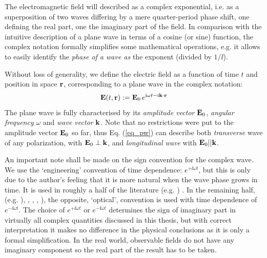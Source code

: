 The electromagnetic field will described as a complex exponential, i.e. as a superposition of two waves differing by a mere quarter-period phase shift, one defining the real part, one the imaginary part of the field. In comparison with the intuitive description of a plane wave in terms of a cosine (or sine) function, the complex notation formally simplifies some mathematical operations, e.g. it allows to easily identify the \textit{phase of a wave as} the exponent (divided by $1/\ii$). 

 

Without loss of generality, we define the electric field as a function of time $t$ and position in space ${\mathbf{r}}$, corresponding to a plane wave in the complex notation:
\begin{equation} \mathbf{E}(t, {\mathbf{r}}) := \mathbf{E}_0\, e^{{\mathrm i}\omega t - {\mathrm i}{\mathbf{k}}\cdot{\mathbf{r}}} \label{eq_pw}\end{equation}
The plane wave is fully characterised by its \textit{amplitude vector} $\mathbf{E}_0$, \textit{angular frequency} $\omega$ and \textit{wave vector} ${\mathbf{k}}$. Note that no restrictions were put to the amplitude vector $\mathbf{E}_0$ so far, thus Eq. (\ref{eq_pw}) can describe both \textit{transverse} wave of any polarization, with $\mathbf{E}_0 \perp {\mathbf{k}}$, and \textit{longitudinal wave} with $\mathbf{E}_0 || {\mathbf{k}}$.

An important note shall be made on the sign convention for the complex wave. 
We use the `engineering' convention of time dependence: $e^{+\ii \omega t}$, but this is only due to the author's feeling that it is more natural when the wave phase grows in time. 
It is used in  roughly a half of the literature 
(e.g. \cite[p. 9]{engheta2006book}
\cite[pp. 21, 99]{krowne2007book}
\cite[chap. 1-4, 6, 9, 10]{eleftheriades2005book})
.  In the remaining half,
(e.g. \cite[chap. 5, 7, 8]{eleftheriades2005book}),
\cite{jackson1962book}, 
\cite{veselago1968},
\cite{born1999book}, \cite[p. 5]{noginov2011book}), 
the opposite, `optical', convention is used with time dependence of $e^{-\ii \omega t}$. 
The choice of $e^{+\ii\omega t}$ or $e^{-\ii\omega t}$ determines the sign of imaginary part in virtually all complex quantities discussed in this thesis, but with correct interpretation it makes no difference in the physical conclusions as it is only a formal simplification.
In the real world, observable fields do not have any imaginary component so the real part of the result has to be taken. 

